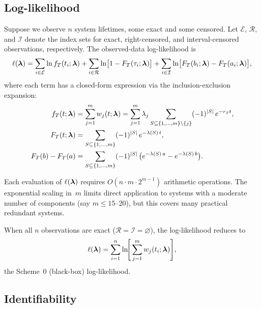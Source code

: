 \subsection{Log-likelihood}
\label{sec:log-likelihood}

Suppose we observe $n$ system lifetimes, some exact and some censored.
Let $\mathcal{E}$, $\mathcal{R}$, and $\mathcal{I}$ denote the index
sets for exact, right-censored, and interval-censored observations,
respectively.  The observed-data log-likelihood is
\begin{equation}\label{eq:loglik}
  \ell(\boldsymbol{\lambda}) = \sum_{i \in \mathcal{E}} \ln f_T(t_i; \boldsymbol{\lambda})
  + \sum_{i \in \mathcal{R}} \ln \bigl[1 - F_T(\tau_i; \boldsymbol{\lambda})\bigr]
  + \sum_{i \in \mathcal{I}} \ln \bigl[F_T(b_i; \boldsymbol{\lambda}) - F_T(a_i; \boldsymbol{\lambda})\bigr],
\end{equation}
where each term has a closed-form expression via the inclusion-exclusion
expansion:
\begin{align}
  f_T(t; \boldsymbol{\lambda}) &= \sum_{j=1}^m w_j(t; \boldsymbol{\lambda})
  = \sum_{j=1}^m \lambda_j \sum_{S \subseteq \{1,\ldots,m\} \setminus \{j\}}
    (-1)^{|S|}\, e^{-r_S t},
  \label{eq:fT-ie} \\
  F_T(t; \boldsymbol{\lambda}) &= \sum_{S \subseteq \{1,\ldots,m\}}
    (-1)^{|S|}\, e^{-\lambda(S)\, t},
  \label{eq:FT-ie} \\
  F_T(b) - F_T(a) &= \sum_{S \subseteq \{1,\ldots,m\}}
    (-1)^{|S|}\, \bigl(e^{-\lambda(S)\, a} - e^{-\lambda(S)\, b}\bigr).
  \label{eq:interval-ie}
\end{align}

\noindent
Each evaluation of $\ell(\boldsymbol{\lambda})$ requires $O(n \cdot m \cdot 2^{m-1})$
arithmetic operations.  The exponential scaling in~$m$ limits direct
application to systems with a moderate number of components
(say $m \leq 15$--$20$), but this covers many practical redundant
systems.

When all $n$ observations are exact ($\mathcal{R} = \mathcal{I} = \varnothing$),
the log-likelihood reduces to
\begin{equation}\label{eq:loglik-exact}
  \ell(\boldsymbol{\lambda}) = \sum_{i=1}^n \ln\!\Biggl[\,
    \sum_{j=1}^m w_j(t_i; \boldsymbol{\lambda}) \Biggr],
\end{equation}
the Scheme~0 (black-box) log-likelihood.

\subsection{Identifiability}
\label{sec:identifiability}


